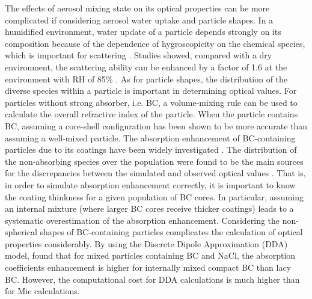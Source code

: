 \documentclass[edeposit,fullpage]{uiucthesis2009}
\begin{document}
The effects of aerosol mixing state on its optical properties can be
more complicated if considering aerosol water uptake and particle
shapes. In a humidified environment, water update of a particle
depends strongly on its composition because of the dependence of
hygroscopicity on the chemical species, which is important for
scattering \citep{MichelFlores2012, Zieger2013, Titos2014,
  Titos2016}. Studies showed, compared with a dry environment, the
scattering ability can be enhanced by a factor of 1.6 at the
environment with RH of 85\% \citep{Burgos2020}. As for particle
shapes, the distribution of the diverse species {\rm within} a
particle is important in determining optical values. For particles
without strong absorber, i.e. BC, a volume-mixing rule can be used to
calculate the overall refractive index of the particle. When the
particle contains BC, assuming a core-shell configuration has been
shown to be more accurate \citep{Bond2006} than assuming a well-mixed
particle. The absorption enhancement of BC-containing particles due to
its coatings have been widely investigated \citep{Moffet2009,Liu2017,
  wu2020light}. The distribution of the non-absorbing species over the
population were found to be the main sources for the discrepancies
between the simulated and observed optical values \citep{Fierce2016,
  Fierce2020}. That is, in order to simulate absorption enhancement
correctly, it is important to know the coating thinkness for a given
population of BC cores. In particular, assuming an internal mixture
(where larger BC cores receive thicker coatings) leads to a systematic
overestimation of the absorption enhancement. Considering the
non-spherical shapes of BC-containing particles complicates the
calculation of optical properties considerably. By using the Discrete
Dipole Approximation (DDA) model, \citet{scarnato2013effects} found
that for mixed particles containing BC and NaCl, the absorption
coefficients enhancement is higher for internally mixed compact BC
than lacy BC. However, the computational cost for DDA calculations is
much higher than for Mie calculations.
\end{document}
